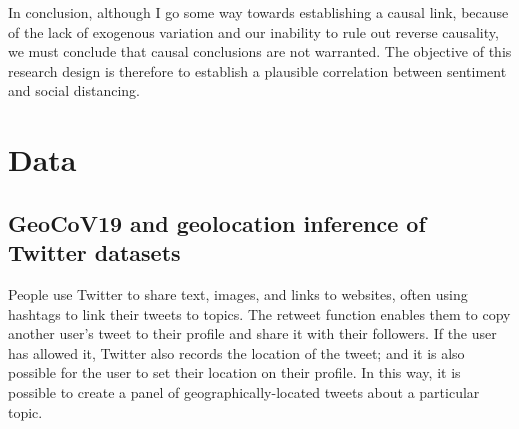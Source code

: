 \documentclass{article}
\begin{document}
In conclusion, although I go some way towards establishing a causal link, because of the lack of exogenous variation and our inability to rule out reverse causality, we must conclude that causal conclusions are not warranted. The objective of this research design is therefore to establish a plausible correlation between sentiment and social distancing.


\section{Data}
\subsection{GeoCoV19 and geolocation inference of Twitter datasets}\label{geocov}
People use Twitter to share text, images, and links to websites, often using hashtags to link their tweets to topics. The retweet function enables them to copy another user's tweet to their profile and share it with their followers. If the user has allowed it, Twitter also records the location of the tweet; and it is also possible for the user to set their location on their profile. In this way, it is possible to create a panel of geographically-located tweets about a particular topic. 
\end{document}
